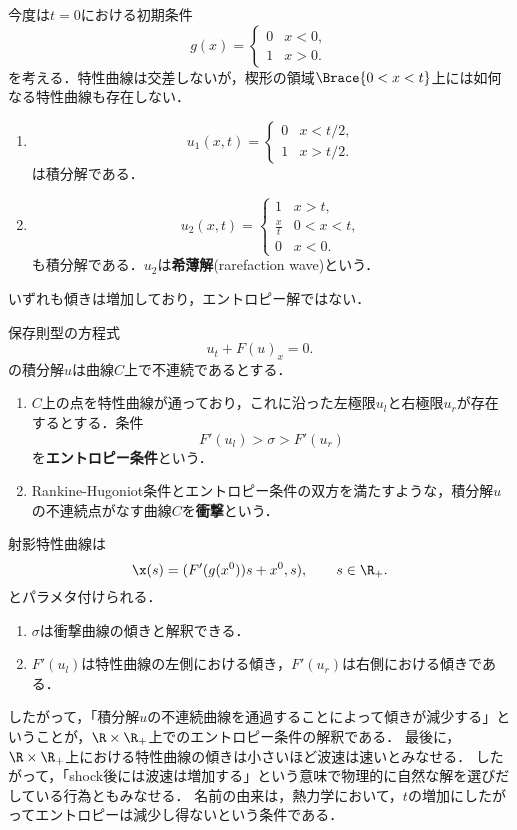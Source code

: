 \documentclass[uplatex,dvipdfmx]{jsreport}
\begin{document}
\begin{example}
    今度は$t=0$における初期条件
    \[g(x)=\begin{cases}
        0&x<0,\\
        1&x>0.
    \end{cases}\]
    を考える．特性曲線は交差しないが，楔形の領域$\Brace{0<x<t}$上には如何なる特性曲線も存在しない．
    \begin{enumerate}
        \item \[u_1(x,t)=\begin{cases}
            0&x<t/2,\\
            1&x>t/2.
        \end{cases}\]
        は積分解である．
        \item \[u_2(x,t)=\begin{cases}
            1&x>t,\\
            \frac{x}{t}&0<x<t,\\
            0&x<0.
        \end{cases}\]
        も積分解である．$u_2$は\textbf{希薄解}(rarefaction wave)という．
    \end{enumerate}
    いずれも傾きは増加しており，エントロピー解ではない．
\end{example}

\begin{definition}
    保存則型の方程式
    \[u_t+F(u)_x=0.\]
    の積分解$u$は曲線$C$上で不連続であるとする．
    \begin{enumerate}
        \item $C$上の点を特性曲線が通っており，これに沿った左極限$u_l$と右極限$u_r$が存在するとする．条件
        \[F'(u_l)>\sigma>F'(u_r)\]
        を\textbf{エントロピー条件}という．
        \item Rankine-Hugoniot条件とエントロピー条件の双方を満たすような，積分解$u$の不連続点がなす曲線$C$を\textbf{衝撃}という．
    \end{enumerate}
\end{definition}
\begin{remarks}[エントロピー条件の意味]
    射影特性曲線は
    \[\x(s)=(F'(g(x^0))s+x^0,s),\qquad s\in\R_+.\]
    とパラメタ付けられる．
    \begin{enumerate}
        \item $\sigma$は衝撃曲線の傾きと解釈できる．
        \item $F'(u_l)$は特性曲線の左側における傾き，$F'(u_r)$は右側における傾きである．
    \end{enumerate}
    したがって，「積分解$u$の不連続曲線を通過することによって傾きが減少する」ということが，$\R\times\R_+$上でのエントロピー条件の解釈である．
    最後に，$\R\times\R_+$上における特性曲線の傾きは小さいほど波速は速いとみなせる．
    したがって，「shock後には波速は増加する」という意味で物理的に自然な解を選びだしている行為ともみなせる．
    名前の由来は，熱力学において，$t$の増加にしたがってエントロピーは減少し得ないという条件である．
\end{remarks}
\end{document}
